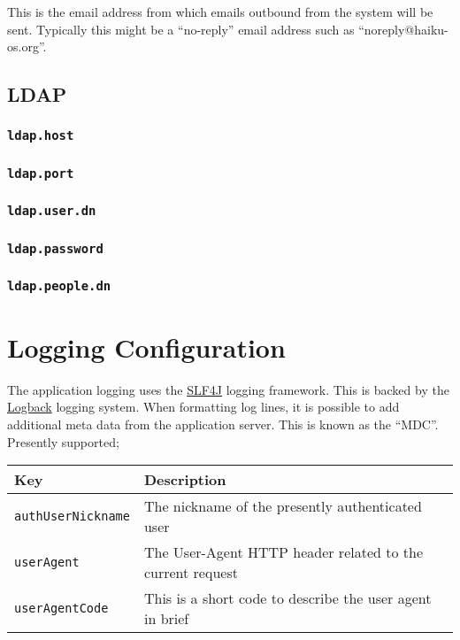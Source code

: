 This is the email address from which emails outbound from the system will be sent.  Typically this might be a ``no-reply'' email address such as ``noreply@haiku-os.org''.

\subsection{LDAP}


\subsubsection{\tt ldap.host}
\subsubsection{\tt ldap.port}
\subsubsection{\tt ldap.user.dn}
\subsubsection{\tt ldap.password}
\subsubsection{\tt ldap.people.dn}

\section{Logging Configuration}

The application logging uses the \href{http://www.slf4j.org/}{SLF4J} logging framework.  This is backed by the \href{http://logback.qos.ch/}{Logback} logging system.  When formatting log lines, it is possible to add additional meta data from the application server.  This is known as the ``MDC''.  Presently supported;

\begin{tabular}{ | l | l | }
\hline
Key & Description \\
\hline
{\tt authUserNickname} & The nickname of the presently authenticated user \\
{\tt userAgent} & The User-Agent HTTP header related to the current request \\
{\tt userAgentCode} & This is a short code to describe the user agent in brief \\
\hline
\end{tabular}